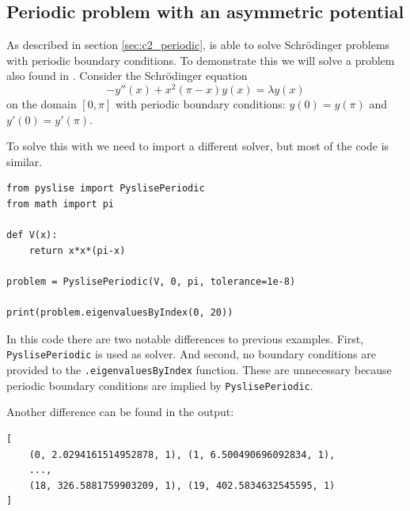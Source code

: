 \subsection{Periodic problem with an asymmetric potential}\label{sec:c2_experiments_andrew_periodic}

As described in section \ref{sec:c2_periodic},  is able to solve Schrödinger problems with periodic boundary conditions. To demonstrate this we will solve a problem also found in \cite{andrew_correction_1989}. Consider the Schrödinger equation
$$
    -y''(x) + x^2(\pi-x) y(x) = \lambda y(x)
$$
on the domain $[0, \pi]$ with periodic boundary conditions: $y(0) = y(\pi)$ and $y'(0) = y'(\pi)$.

To solve this with \pyslise{} we need to import a different solver, but most of the code is similar.
\begin{verbatim}
from pyslise import PyslisePeriodic
from math import pi

def V(x):
    return x*x*(pi-x)

problem = PyslisePeriodic(V, 0, pi, tolerance=1e-8)

print(problem.eigenvaluesByIndex(0, 20))
\end{verbatim}

In this code there are two notable differences to previous examples. First, \texttt{PyslisePeriodic} is used as solver. And second, no boundary conditions are provided to the \texttt{.eigenvaluesByIndex} function. These are unnecessary because periodic boundary conditions are implied by \texttt{PyslisePeriodic}.

Another difference can be found in the output:
\begin{verbatim}
[
    (0, 2.0294161514952878, 1), (1, 6.500490696092834, 1),
    ...,
    (18, 326.5881759903209, 1), (19, 402.5834632545595, 1)
]
\end{verbatim}

